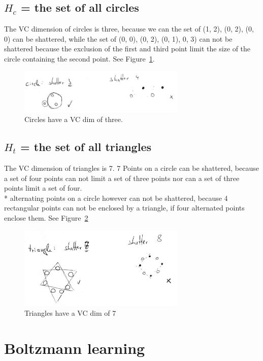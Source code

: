 \documentclass{scrartcl}
\begin{document}
\subsection{$H_{c}$ = the set of all circles} 
The VC dimension of circles is three, because we can the set of (1, 2), (0, 2), (0, 0) can be shattered, while the set of {(0, 0), (0, 2)}, {(0, 1), 0, 3)} can not be shattered because the exclusion of the first and third point limit the size of the circle containing the second point. See Figure~\ref{fig:circle}.

\begin{figure}
 \center
 \includegraphics[width= 8cm]{vcdim_circle.jpg}
 \caption{Circles have a VC dim of three.}
 \label{fig:circle}
\end{figure}

\subsection{$H_{t}$ = the set of all triangles}
The VC dimension of triangles is 7. 7 Points on a circle can be shattered, because a set of four points can not limit a set of three points nor can a set of three points limit a set of four.\\
* alternating points on a circle however can not be shattered, because 4 rectangular points can not be enclosed by a triangle, if four alternated points enclose them. See Figure~\ref{fig:triangle}

\begin{figure}
 \center
 \includegraphics[width= 8cm]{vcdim_triangles.jpg}
 \caption{Triangles have a VC dim of 7}
 \label{fig:triangle}
\end{figure}

\section{Boltzmann learning}
\end{document}
